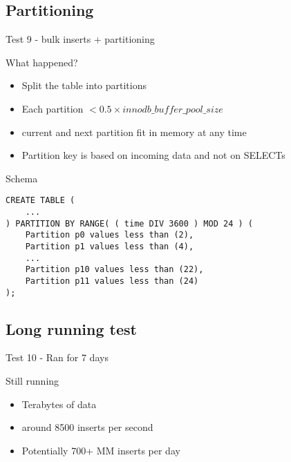 \documentclass{beamer}
\begin{document}
\subsection{Partitioning}
\begin{frame}{Test 9 - bulk inserts + partitioning}
\end{frame}

\begin{frame}{What happened?}
  \begin{itemize}
  \item Split the table into partitions
  \item Each partition $ < 0.5 \times innodb\_buffer\_pool\_size $
  \item current and next partition fit in memory at any time
  \item Partition key is based on incoming data and not on SELECTs
  \end{itemize}
\end{frame}

\begin{frame}[fragile]{Schema}
\begin{verbatim}
CREATE TABLE (
    ...
) PARTITION BY RANGE( ( time DIV 3600 ) MOD 24 ) (
    Partition p0 values less than (2),
    Partition p1 values less than (4),
    ...
    Partition p10 values less than (22),
    Partition p11 values less than (24)
); 
\end{verbatim}
\end{frame}

\subsection{Long running test}
\begin{frame}{Test 10 - Ran for 7 days}
\end{frame}

\begin{frame}{Still running}
  \begin{block}{}
  \begin{itemize}
  \item Terabytes of data
  \item around 8500 inserts per second
  \item Potentially 700+ MM inserts per day
  \end{itemize}
  \end{block}
\end{frame}
\end{document}
